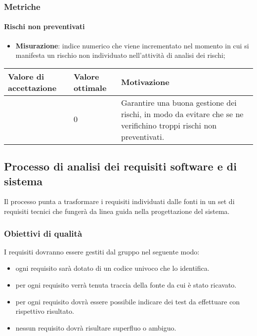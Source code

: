 \subsubsection{Metriche}

\paragraph{Rischi non preventivati}

\begin{itemize}
\item \textbf{Misurazione}: indice numerico che viene incrementato nel momento in cui si manifesta un rischio non individuato nell'attività di analisi dei rischi;
\end{itemize}

\begin{center}
	\begin{tabular}{|P{2.5cm}|P{2.5cm}|P{6cm}|}
		\hline
			\textbf{Valore di accettazione}	& \textbf{Valore ottimale} & \textbf{Motivazione} \\
			\hline
			[$0 - 5$] & $0$ & Garantire una buona gestione dei rischi, in modo da evitare che se ne verifichino troppi rischi non preventivati. \\
			\hline
			\end{tabular}
\end{center}


\subsection{Processo di analisi dei requisiti software e di sistema}

Il processo punta a trasformare i requisiti individuati dalle fonti in un set di requisiti tecnici che fungerà da linea guida nella progettazione del sistema.

\subsubsection{Obiettivi di qualità}
I requisiti dovranno essere gestiti dal gruppo nel seguente modo:

\begin{itemize}
\item ogni requisito sarà dotato di un codice univoco che lo identifica.
\item per ogni requisito verrà tenuta traccia della fonte da cui è stato ricavato.
\item per ogni requisito dovrà essere possibile indicare dei test da effettuare con rispettivo risultato.
\item nessun requisito dovrà risultare superfluo o ambiguo.
\end{itemize}

